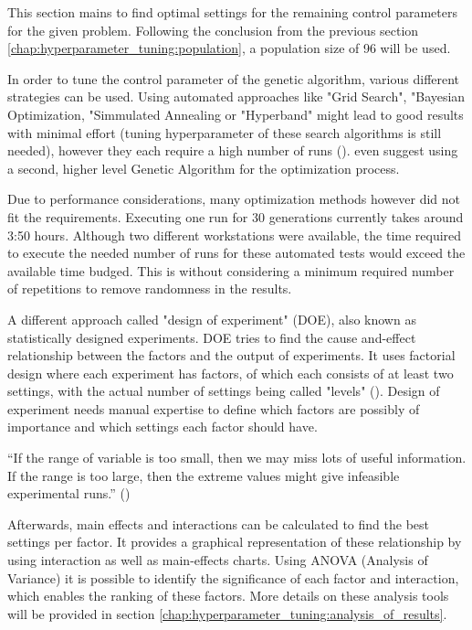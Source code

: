 This section mains to find optimal settings for the remaining control parameters for the given problem.
Following the conclusion from the previous section \ref{chap:hyperparameter_tuning:population}, a population size of 96 will be used. 

In order to tune the control parameter of the genetic algorithm, various different strategies can be used. Using automated approaches like "Grid Search", "Bayesian Optimization, "Simmulated Annealing or "Hyperband" might lead to good results with minimal effort (tuning hyperparameter of these search algorithms is still needed), however they each require a high number of runs (\cite{kacprzyk_parameter_2007}). \cite{kacprzyk_parameter_2007} even suggest using a second, higher level Genetic Algorithm for the optimization process.

Due to performance considerations, many optimization methods however did not fit the requirements.
Executing one run for 30 generations currently takes around 3:50 hours. Although two different workstations were available, the time required to execute the needed number of runs for these automated tests would exceed the available time budged. This is without considering a minimum required number of repetitions to remove randomness in the results.


A different approach called "design of experiment" (DOE), also known as statistically designed experiments. DOE tries to find the cause and-effect relationship between the factors and the output of experiments.
It uses factorial design where each experiment has factors, of which each consists of at least two settings, with the actual number of settings being called "levels" (\cite{yang_design_2009}). Design of experiment needs manual expertise to define which factors are possibly of importance and which settings each factor should have.

\enquote{If the range of variable is too small, then we may miss lots of useful information. If the range is too large, then the extreme values might give infeasible experimental runs.} (\cite{yang_design_2009})

Afterwards, main effects and interactions can be calculated to find the best settings per factor. It provides a graphical representation of these relationship by using interaction as well as main-effects charts.
Using ANOVA (Analysis of Variance) it is possible to identify the significance of each factor and interaction, which enables the ranking of these factors. More details on these analysis tools will be provided in section \ref{chap:hyperparameter_tuning:analysis_of_results}.

